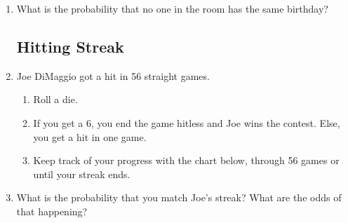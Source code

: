 \begin{enumerate}
	\item What is the probability that no one in the room has the same birthday? \vfill
	
	\clearpage
	\subsection{Hitting Streak}
	\item Joe DiMaggio got a hit in 56 straight games.
\begin{enumerate}
	\item Roll a die.
	\item If you get a 6, you end the game hitless and Joe wins the contest. Else, you get a hit in one game.
	\item Keep track of your progress with the chart below, through 56 games or until your streak ends.
\end{enumerate}
\begin{center}
\end{center}

\item What is the probability that you match Joe's streak?  What are the odds of that happening?
\end{enumerate}